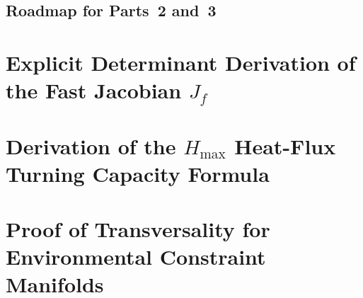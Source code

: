 \documentclass[11pt,letterpaper]{article}
\begin{document}
\subsection{Roadmap for Parts~2 and~3}

\appendix

\section{Explicit Determinant Derivation of the Fast Jacobian $J_f$}
\label{app:jacobian}

\section{Derivation of the $H_{\max}$ Heat-Flux Turning Capacity Formula}
\label{app:hmax}

\section{Proof of Transversality for Environmental Constraint Manifolds}
\label{app:transversality}

\clearpage

\nocite{*}




\end{document}
